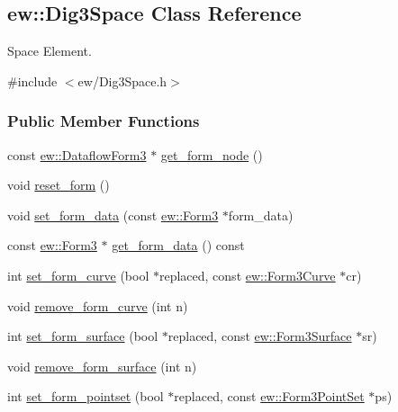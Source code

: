 \hypertarget{classew_1_1Dig3Space}{
\subsection{ew::Dig3Space Class Reference}
\label{classew_1_1Dig3Space}
}


Space Element.  




{\ttfamily \#include $<$ew/Dig3Space.h$>$}

\subsubsection*{Public Member Functions}
\begin{DoxyCompactItemize}
\item 
const \hyperlink{classew_1_1DataflowForm3}{ew::DataflowForm3} $\ast$ \hyperlink{classew_1_1Dig3Space_aa7bb402a0efa069bd3bc38c46ffe9b68}{get\_\-form\_\-node} ()
\item 
void \hyperlink{classew_1_1Dig3Space_a920cc8f98f082fddbf1de18621976172}{reset\_\-form} ()
\item 
void \hyperlink{classew_1_1Dig3Space_aa179034ae1e56e82b11505f0eb43a453}{set\_\-form\_\-data} (const \hyperlink{classew_1_1Form3}{ew::Form3} $\ast$form\_\-data)
\item 
const \hyperlink{classew_1_1Form3}{ew::Form3} $\ast$ \hyperlink{classew_1_1Dig3Space_a645d433945b2cc2e884f7b021435069a}{get\_\-form\_\-data} () const 
\item 
int \hyperlink{classew_1_1Dig3Space_a7f263aecc7500ef7d3ade73ad3a2ecd7}{set\_\-form\_\-curve} (bool $\ast$replaced, const \hyperlink{classew_1_1Form3Curve}{ew::Form3Curve} $\ast$cr)
\item 
void \hyperlink{classew_1_1Dig3Space_a288e09fc51893bbc770693d390bb41dc}{remove\_\-form\_\-curve} (int n)
\item 
int \hyperlink{classew_1_1Dig3Space_a56f5bb5aea82832e14d0ae558b8e8b67}{set\_\-form\_\-surface} (bool $\ast$replaced, const \hyperlink{classew_1_1Form3Surface}{ew::Form3Surface} $\ast$sr)
\item 
void \hyperlink{classew_1_1Dig3Space_a580843a50f9080b1cfd0232f14825d79}{remove\_\-form\_\-surface} (int n)
\item 
int \hyperlink{classew_1_1Dig3Space_a40cc9ace8fb6b3f9c4d250a05fb19b83}{set\_\-form\_\-pointset} (bool $\ast$replaced, const \hyperlink{classew_1_1Form3PointSet}{ew::Form3PointSet} $\ast$ps)
\item 

\end{DoxyCompactItemize}
